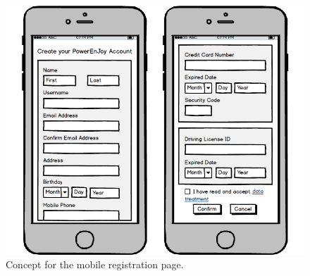 \begin{figure}[H]
	\centering
	\includegraphics[width=\textwidth]{mockup/MobileRegistration.png}
	\caption{Concept for the mobile registration page.}
\end{figure}


